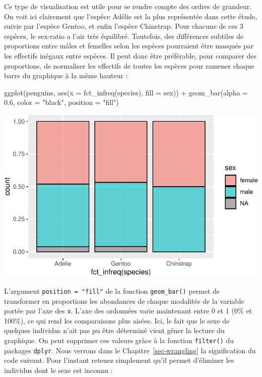 \documentclass[
  a4paper,
  DIV=11,
  numbers=noendperiod,
  oneside]{scrreprt}
\newenvironment{Shaded}{}{}
\newcommand{\AttributeTok}[1]{\textcolor[rgb]{0.84,0.23,0.29}{#1}}
\newcommand{\FloatTok}[1]{\textcolor[rgb]{0.00,0.36,0.77}{#1}}
\newcommand{\FunctionTok}[1]{\textcolor[rgb]{0.44,0.26,0.76}{#1}}
\newcommand{\NormalTok}[1]{\textcolor[rgb]{0.14,0.16,0.18}{#1}}
\newcommand{\SpecialCharTok}[1]{\textcolor[rgb]{0.00,0.36,0.77}{#1}}
\newcommand{\StringTok}[1]{\textcolor[rgb]{0.01,0.18,0.38}{#1}}
\begin{document}
Ce type de visualisation est utile pour se rendre compte des ordres de
grandeur. On voit ici clairement que l'espèce Adélie est la plus
représentée dans cette étude, suivie par l'espèce Gentoo, et enfin
l'espèce Chinstrap. Pour chacune de ces 3 espèces, le sex-ratio a l'air
très équilibré. Toutefois, des différences subtiles de proportions entre
mâles et femelles selon les espèces pourraient être masqués par les
effectifs inégaux entre espèces. Il peut donc être préférable, pour
comparer des proportions, de normaliser les effectifs de toutes les
espèces pour ramener chaque barre du graphique à la même hauteur :

\begin{Shaded}
\begin{Highlighting}[]
\FunctionTok{ggplot}\NormalTok{(penguins, }\FunctionTok{aes}\NormalTok{(}\AttributeTok{x =} \FunctionTok{fct\_infreq}\NormalTok{(species), }\AttributeTok{fill =}\NormalTok{ sex)) }\SpecialCharTok{+}
  \FunctionTok{geom\_bar}\NormalTok{(}\AttributeTok{alpha =} \FloatTok{0.6}\NormalTok{, }\AttributeTok{color =} \StringTok{"black"}\NormalTok{, }\AttributeTok{position =} \StringTok{"fill"}\NormalTok{)}
\end{Highlighting}
\end{Shaded}

\includegraphics{03-visualization_files/figure-pdf/unnamed-chunk-56-1.pdf}

L'argument \texttt{position\ =\ "fill"} de la fonction
\texttt{geom\_bar()} permet de transformer en proportions les abondances
de chaque modalités de la variable portée par l'axe des \texttt{x}.
L'axe des ordonnées varie maintenant entre 0 et 1 (0\% et 100\%), ce qui
rend les comparaisons plus aisées. Ici, le fait que le sexe de quelques
individus n'ait pas pu être déterminé vient gêner la lecture du
graphique. On peut supprimer ces valeurs grâce à la fonction
\texttt{filter()} du packages \texttt{dplyr}. Nous verrons dans le
Chapitre~\ref{sec-wrangling} la signification du code suivant. Pour
l'instant retenez simplement qu'il permet d'éliminer les individus dont
le sexe est inconnu :
\end{document}
